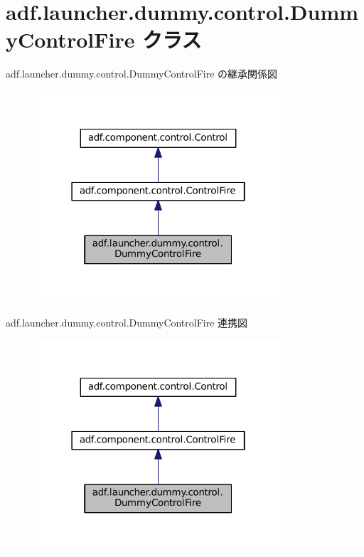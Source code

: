 \hypertarget{classadf_1_1launcher_1_1dummy_1_1control_1_1DummyControlFire}{}\section{adf.\+launcher.\+dummy.\+control.\+Dummy\+Control\+Fire クラス}
\label{classadf_1_1launcher_1_1dummy_1_1control_1_1DummyControlFire}


adf.\+launcher.\+dummy.\+control.\+Dummy\+Control\+Fire の継承関係図
\nopagebreak
\begin{figure}[H]
\begin{center}
\leavevmode
\includegraphics[width=262pt]{classadf_1_1launcher_1_1dummy_1_1control_1_1DummyControlFire__inherit__graph}
\end{center}
\end{figure}


adf.\+launcher.\+dummy.\+control.\+Dummy\+Control\+Fire 連携図
\nopagebreak
\begin{figure}[H]
\begin{center}
\leavevmode
\includegraphics[width=262pt]{classadf_1_1launcher_1_1dummy_1_1control_1_1DummyControlFire__coll__graph}
\end{center}
\end{figure}
